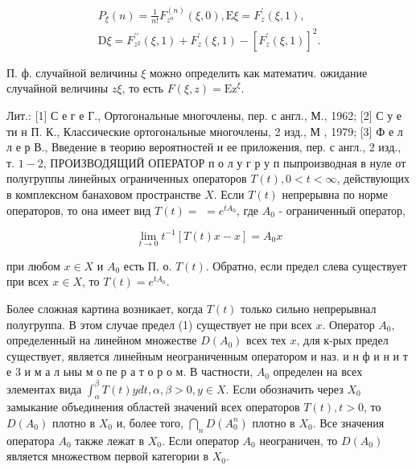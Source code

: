 \documentclass[10pt]{article}
\begin{document}
\[

\begin{gathered}

P_{\xi}(n)=\frac{1}{n !} F_{z^{n}}^{(n)}(\xi, 0), \mathrm{E} \xi=F_{z}^{\prime}(\xi, 1), \\

\mathrm{D} \xi=F_{z^{2}}^{\prime \prime}(\xi, 1)+F_{z}^{\prime}(\xi, 1)-\left[F_{z}^{\prime}(\xi, 1)\right]^{2} .

\end{gathered}

\]



П. ф. случайной величины $\xi$ можно определить как математич. ожидание случайной величины $z \xi$, то есть $F(\xi, z)=\mathrm{Ez}^{\xi}$.



Лит.: [1] С е г е Г., Ортогональные многочлены, пер. с англ., М., 1962; [2] С у е ти н П. К., Классические ортогональные многочлены, 2 изд., М , 1979; [3] Ф е л л е р В., Введение в теорию вероятностей и ее приложения, пер. с англ., 2 изд., т. $1-2$, ПРОИЗВОДЯЩИЙ ОПЕРАТОР п о л у г р у п пыпроизводная в нуле от полугруппы линейных ограниченных операторов $T(t), 0<t<\infty$, действующих в комплексном банаховом пространстве $X$. Если $T(t)$ непрерывна по норме операторов, то она имеет вид $T(t)=$ $=e^{t A_{0}}$, где $A_{0}$ - ограниченный оператор,



\[

\lim _{t \rightarrow 0} t^{-1}[T(t) x-x]=A_{0} x

\]



при любом $x \in X$ и $A_{0}$ есть П. о. $T(t)$. Обратно, если предел слева существует при всех $x \in X$, то $T(t)=e^{t A_{0}}$.



Более сложная картина возникает, когда $T(t)$ только сильно непрерывнал полугруппа. В этом случае предел (1) существует не при всех $x$. Оператор $A_{0}$, определенный на линейном множестве $D\left(A_{0}\right)$ всех тех $x$, для к-рых предел существует, является линейным неограниченным оператором и наз. и н ф и н и т е 3 и м а л ьны м о пе р а т о р о м. В частности, $A_{0}$ определен на всех элементах вида $\int_{\alpha}^{\beta} T(t) y d t, \alpha, \beta>0, y \in X$. Если обозначить через $X_{0}$ замыкание объединения областей значений всех операторов $T(t), t>0$, то $D\left(A_{0}\right)$ плотно в $X_{0}$ и, более того, $\bigcap_{n} D\left(A_{0}^{n}\right)$ плотно в $X_{0}$. Все значения оператора $A_{0}$ также лежат в $X_{0}$. Если оператор $A_{0}$ неограничен, то $D\left(A_{0}\right)$ является множеством первой категории в $X_{0}$.
\end{document}
